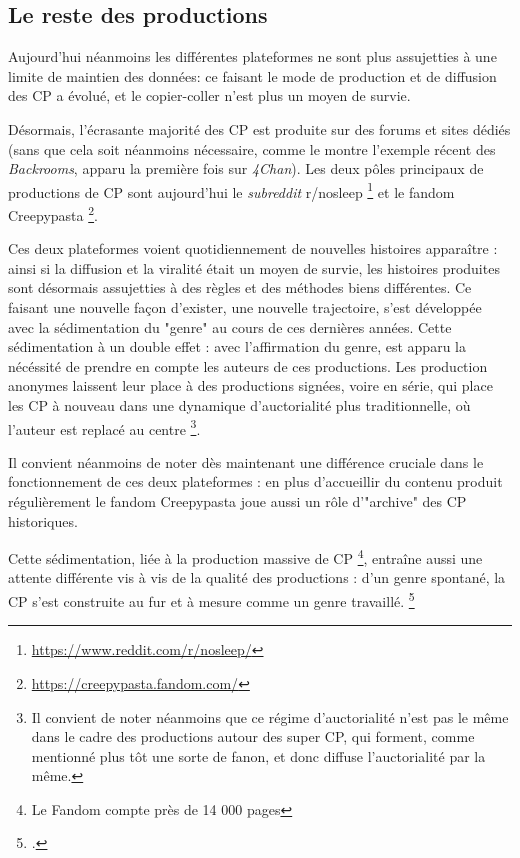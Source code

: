 \documentclass[12pt,a4paper,oneside,titlepage]{book} %
\begin{document}
	\subsection{Le reste des productions}
	
	Aujourd’hui néanmoins les différentes plateformes ne sont plus assujetties à une limite de maintien des données: ce faisant le mode de production et de diffusion des CP a évolué, et le copier-coller n'est plus un moyen de survie.
	
	Désormais, l’écrasante majorité des CP est produite sur des forums et sites dédiés (sans que cela soit néanmoins nécessaire, comme le montre l'exemple récent des \emph{Backrooms}, apparu la première fois sur \emph{4Chan}). Les deux pôles principaux de productions de CP sont aujourd'hui le \emph{subreddit} r/nosleep \footnote{\url{https://www.reddit.com/r/nosleep/}} et le fandom Creepypasta \footnote{\url{https://creepypasta.fandom.com/}}. 
	
	Ces deux plateformes voient quotidiennement de nouvelles histoires apparaître : ainsi si la diffusion et la viralité était un moyen de survie, les histoires produites sont désormais assujetties à des règles et des méthodes biens différentes. Ce faisant une nouvelle façon d'exister, une nouvelle trajectoire, s'est développée avec la sédimentation du "genre" au cours de ces dernières années. 
	Cette sédimentation à un double effet : avec l'affirmation du genre, est apparu la nécéssité de prendre en compte les auteurs de ces productions. Les production anonymes laissent leur place à des productions signées, voire en série, qui place les CP à nouveau dans une dynamique d'auctorialité plus traditionnelle, où l'auteur est replacé au centre \footnote{Il convient de noter néanmoins que ce régime d'auctorialité n'est pas le même dans le cadre des productions autour des super CP, qui forment, comme mentionné plus tôt une sorte de fanon, et donc diffuse l'auctorialité par la même.}.
	
	Il convient néanmoins de noter dès maintenant une différence cruciale dans le fonctionnement de ces deux plateformes : en plus d'accueillir du contenu produit régulièrement le fandom Creepypasta joue aussi un rôle d'"archive" des CP historiques. 
	
	Cette sédimentation, liée à la production massive de CP \footnote{Le Fandom compte près de 14 000 pages}, entraîne aussi une attente différente vis à vis de la qualité des productions : d'un genre spontané, la CP s'est construite au fur et à mesure comme un genre travaillé. \footcite{garcia_roca_creepypasta_2021}
	
\end{document}
